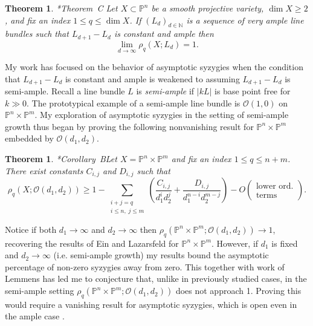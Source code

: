 \documentclass[11pt,reqno]{amsart}
\newtheorem{theorem}[lemma]{Theorem}
\theoremstyle{remark}
\renewcommand{\O}{\mathcal{O}}
\newcommand{\N}{\mathbb{N}}
\renewcommand{\P}{\mathbb{P}}
\begin{document}
\begin{theorem}\cite{einLazarsfeld12}*{Theorem~C}
Let $X\subset \P^n$ be a smooth projective variety, $\dim X \geq2$, and fix an index $1\leq q \leq \dim X$. If $(L_{d})_{d\in\N}$ is a sequence of very ample line bundles such that $L_{d+1}-L_{d}$ is constant and ample then
\[
\lim_{d\to\infty} \rho_{q}\left(X; L_d\right) = 1.
\]
\end{theorem}

My work has focused on the behavior of asymptotic syzygies when the condition that $L_{d+1}-L_{d}$ is constant and ample is weakened to assuming $L_{d+1}-L_{d}$ is semi-ample. Recall a line bundle $L$ is \textit{semi-ample} if $|kL|$ is base point free for $k\gg0$. The prototypical example of a semi-ample line bundle is $\O(1,0)$ on $\P^{n}\times \P^{m}$. My exploration of asymptotic syzygies in the setting of semi-ample growth thus began by proving the following nonvanishing result for $\P^{n}\times\P^{m}$ embedded by $\O(d_{1},d_{2})$. 

\begin{theorem}\cite{bruce19-semiample}*{Corollary~B}\label{thm:bruce-semiample}
Let $X=\P^{n}\times\P^{m}$ and fix an index $1\leq q \leq n+m$. There exist constants $C_{i,j}$ and $D_{i,j}$ such that
\[
\rho_{q}\left(X; \O\left(d_1,d_2\right)\right)\geq1-\sum_{\substack{i+j=q \\  i \leq n, \; j \leq m}}\left(
\frac{C_{i,j}}{d_1^id_2^j}+\frac{D_{i,j}}{d_1^{n-i}d_2^{m-j}}\right)-O\left(\begin{matrix}\text{lower ord.}\\ \text{terms}\end{matrix}\right).
\]
\end{theorem}

Notice if both $d_{1}\to \infty$ and $d_{2}\to\infty$ then $\rho_{q}\left(\P^{n}\times\P^{m}; \O(d_1,d_2)\right)\to1$, recovering the results of Ein and Lazarsfeld for $\P^n\times\P^m$. However, if $d_{1}$ is fixed and $d_{2}\to \infty$ (i.e. semi-ample growth) my results bound the asymptotic percentage of non-zero syzygies away from zero. This together with work of Lemmens \cite{lemmens18} has led me to conjecture that, unlike in previously studied cases, in the semi-ample setting $\rho_{q}\left(\P^{n}\times\P^{m}; \O(d_1,d_2)\right)$ does not approach 1. Proving this would require a vanishing result for asymptotic syzygies, which is open even in the ample case  \cite[Conjectures~7.1,~7.5]{einLazarsfeld12}.


\end{document}
